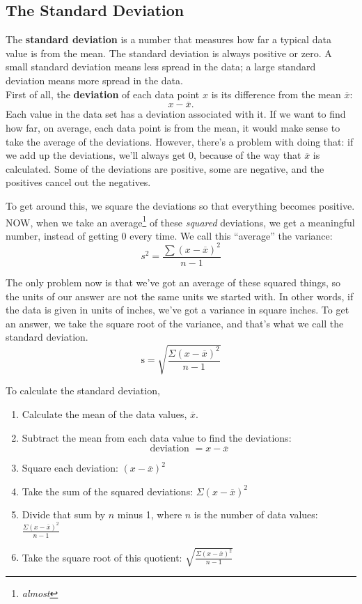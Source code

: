 \subsection{The Standard Deviation}

The \textbf{standard deviation} is a number that measures how far a typical data value is from the mean. The standard deviation is always positive or zero. A small standard deviation means less spread in the data; a large standard deviation means more spread in the data.\\

First of all, the \textbf{deviation} of each data point $x$ is its difference from the mean $\overline{x}$:
\[x-\overline{x}.\]
Each value in the data set has a deviation associated with it.  If we want to find how far, on average, each data point is from the mean, it would make sense to take the average of the deviations.  However, there's a problem with doing that: if we add up the deviations, we'll always get 0, because of the way that $\overline{x}$ is calculated.  Some of the deviations are positive, some are negative, and the positives cancel out the negatives.

To get around this, we square the deviations so that everything becomes positive.  NOW, when we take an average\footnote{\textit{almost}} of these \textit{squared} deviations, we get a meaningful number, instead of getting 0 every time.  We call this ``average'' the variance:
\[s^2 = \dfrac{\sum (x-\overline{x})^2}{n-1}\]

The only problem now is that we've got an average of these squared things, so the units of our answer are not the same units we started with.  In other words, if the data is given in units of inches, we've got a variance in square inches.  To get an answer, we take the square root of the variance, and that's what we call the standard deviation.
\[\textrm{s} = \sqrt{\frac{\Sigma (x - \overline{x})^2}{n-1}}\]

To calculate the standard deviation,
\begin{enumerate}
\item Calculate the mean of the data values, $\overline{x}$.
\item Subtract the mean from each data value to find the deviations: 
\[\textrm{deviation } = x - \overline{x}\]
\item Square each deviation: $(x - \overline{x})^2$
\item Take the sum of the squared deviations: $\Sigma (x - \overline{x})^2$
\item Divide that sum by $n$ minus 1, where $n$ is the number of data values: $\frac{\Sigma (x - \overline{x})^2}{n-1}$
\item Take the square root of this quotient: $\sqrt{\frac{\Sigma (x - \overline{x})^2}{n-1}}$
\end{enumerate}

